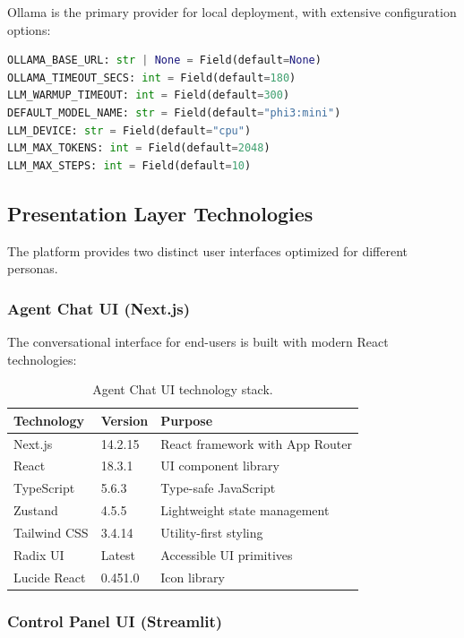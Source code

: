 Ollama is the primary provider for local deployment, with extensive configuration options:

\begin{lstlisting}[language=Python, caption={Ollama integration settings.}]
OLLAMA_BASE_URL: str | None = Field(default=None)
OLLAMA_TIMEOUT_SECS: int = Field(default=180)
LLM_WARMUP_TIMEOUT: int = Field(default=300)
DEFAULT_MODEL_NAME: str = Field(default="phi3:mini")
LLM_DEVICE: str = Field(default="cpu")
LLM_MAX_TOKENS: int = Field(default=2048)
LLM_MAX_STEPS: int = Field(default=10)
\end{lstlisting}

\subsection{Presentation Layer Technologies}

The platform provides two distinct user interfaces optimized for different personas.

\subsubsection{Agent Chat UI (Next.js)}

The conversational interface for end-users is built with modern React technologies:

\begin{table}[ht]
\centering
\caption{Agent Chat UI technology stack.}
\label{tab:ui-agent-stack}
\small
\begin{tabular}{lll}
\hline
\textbf{Technology} & \textbf{Version} & \textbf{Purpose} \\
\hline
Next.js & 14.2.15 & React framework with App Router \\
React & 18.3.1 & UI component library \\
TypeScript & 5.6.3 & Type-safe JavaScript \\
Zustand & 4.5.5 & Lightweight state management \\
Tailwind CSS & 3.4.14 & Utility-first styling \\
Radix UI & Latest & Accessible UI primitives \\
Lucide React & 0.451.0 & Icon library \\
\hline
\end{tabular}
\end{table}

\subsubsection{Control Panel UI (Streamlit)}


